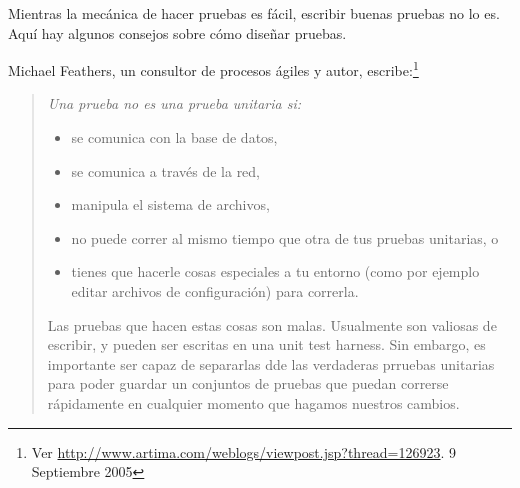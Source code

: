 \documentclass[a4paper,10pt,twoside]{book}
\begin{document}
Mientras la mec\'anica de hacer pruebas es f\'acil, escribir buenas pruebas no lo es.
Aqu\'i hay algunos consejos sobre c\'omo dise\~nar pruebas.

\begin{description}


\item[Reglas de Feathers para pruebas unitarias.]
  Michael Feathers, un consultor de procesos \'agiles y autor, escribe:\footnote{Ver \url{http://www.artima.com/weblogs/viewpost.jsp?thread=126923}. 9 Septiembre 2005} 
  \begin{quotation}
  \noindent
  {\it
	Una prueba no es una prueba unitaria si:  
  \begin{itemize}
	\item se comunica con la base de datos,
	\item se comunica a trav\'es de la red,
	\item manipula el sistema de archivos,
	\item no puede correr al mismo tiempo que otra de tus pruebas unitarias, o
	\item tienes que hacerle cosas especiales a tu entorno (como por ejemplo editar archivos de configuraci\'on) para correrla.
 \end{itemize}

Las pruebas que hacen estas cosas son malas. Usualmente son valiosas de escribir, y pueden ser escritas
en una unit test harness.
Sin embargo, es importante ser capaz de separarlas dde las verdaderas prruebas unitarias para poder
guardar un conjuntos de pruebas que puedan correrse r\'apidamente en cualquier momento que hagamos nuestros
cambios.
 }
  \end{quotation}


\end{description}
\end{document}
